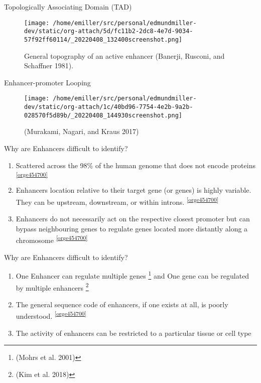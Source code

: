 \documentclass[bigger]{beamer}
\begin{document}
\begin{frame}[label={sec:org91b676b}]{Topologically Associating Domain (TAD)}
\begin{figure}[htbp]
\centering
\texttt{[image: /home/emiller/src/personal/edmundmiller-dev/static/org-attach/5d/fc11b2-2dc8-4e7d-9034-57f92ff60114/\_20220408\_132400screenshot.png]}
\caption{General topography of an active enhancer (Banerji, Rusconi, and Schaffner 1981).}
\end{figure}
\end{frame}

\begin{frame}[label={sec:org6f1dd46}]{Enhancer-promoter Looping}
\begin{figure}[htbp]
\centering
\texttt{[image: /home/emiller/src/personal/edmundmiller-dev/static/org-attach/1c/40bd96-7754-4e2b-9a2b-028570f5d89b/\_20220408\_144930screenshot.png]}
\caption{(Murakami, Nagari, and Kraus 2017)}
\end{figure}
\end{frame}



\begin{frame}[label={sec:orga2e78cb}]{Why are Enhancers difficult to identify?}
\begin{enumerate}
\item Scattered across the 98\% of the human genome that does not encode proteins \textsuperscript{\ref{orge454700}}
\item Enhancers location relative to their target gene (or genes) is highly
variable. They can be upstream, downstream, or within introns. \textsuperscript{\ref{orge454700}}
\item Enhancers do not necessarily act on the respective closest promoter but can
bypass neighbouring genes to regulate genes located more distantly along a
chromosome \textsuperscript{\ref{orge454700}}
\end{enumerate}
\end{frame}

\begin{frame}[label={sec:org945ed36}]{Why are Enhancers difficult to identify?}
\begin{enumerate}
\item One Enhancer can regulate multiple genes \footnote{(Mohrs et al. 2001)} and One
gene can be regulated by multiple enhancers \footnote{(Kim et al. 2018)}
\item The general sequence code of enhancers, if one exists at all, is poorly
understood. \textsuperscript{\ref{orge454700}}
\item The activity of enhancers can be restricted to a particular tissue or cell type
\end{enumerate}
\end{frame}
\end{document}
